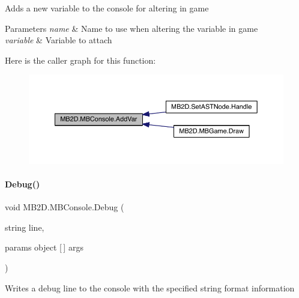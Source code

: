Adds a new variable to the console for altering in game 


\begin{DoxyParams}{Parameters}
{\em name} & Name to use when altering the variable in game\\
\hline
{\em variable} & Variable to attach\\
\hline
\end{DoxyParams}
Here is the caller graph for this function\+:
\nopagebreak
\begin{figure}[H]
\begin{center}
\leavevmode
\includegraphics[width=350pt]{class_m_b2_d_1_1_m_b_console_aeff7888e763a415aeccadc347e09828d_icgraph}
\end{center}
\end{figure}
\hypertarget{class_m_b2_d_1_1_m_b_console_a6f0c0f179b2fef32a130a5e1d4957a70}{}\label{class_m_b2_d_1_1_m_b_console_a6f0c0f179b2fef32a130a5e1d4957a70} 
\paragraph{\texorpdfstring{Debug()}{Debug()}\hspace{0.1cm}{\footnotesize\ttfamily [1/4]}}
{\footnotesize\ttfamily void M\+B2\+D.\+M\+B\+Console.\+Debug (\begin{DoxyParamCaption}\item[{string}]{line,  }\item[{params object \mbox{[}$\,$\mbox{]}}]{args }\end{DoxyParamCaption})\hspace{0.3cm}{\ttfamily [inline]}}



Writes a debug line to the console with the specified string format information 


